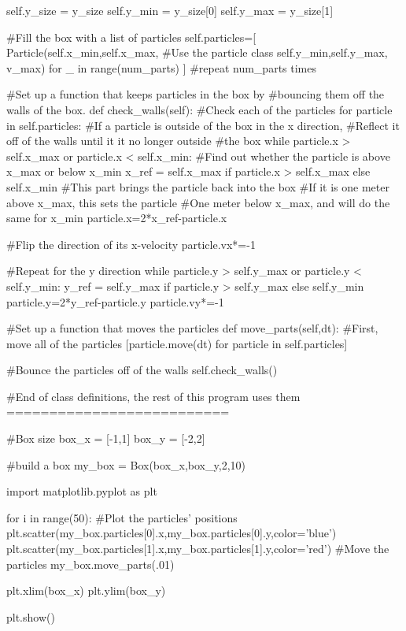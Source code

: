 \begin{codeexample}
\begin{VerbatimOut}{\listingFile}
        self.y_size = y_size
        self.y_min = y_size[0]
        self.y_max = y_size[1]

        #Fill the box with a list of particles
        self.particles=[
             Particle(self.x_min,self.x_max, #Use the particle class
                      self.y_min,self.y_max, v_max)
                      for _ in range(num_parts) ] #repeat num_parts times

    #Set up a function that keeps particles in the box by
    #bouncing them off the walls of the box.
    def check_walls(self):
        #Check each of the particles
        for particle in self.particles:
            #If a particle is outside of the box in the x direction,
            #Reflect it off of the walls until it it no longer outside
            #the box
            while particle.x > self.x_max or particle.x < self.x_min:
                #Find out whether the particle is above x_max or below x_min
                x_ref = self.x_max if particle.x > self.x_max else self.x_min
                #This part brings the particle back into the box
                #If it is one meter above x_max, this sets the particle
                #One meter below x_max, and will do the same for x_min
                particle.x=2*x_ref-particle.x

                #Flip the direction of its x-velocity
                particle.vx*=-1

            #Repeat for the y direction
            while particle.y > self.y_max or particle.y < self.y_min:
                y_ref = self.y_max if particle.y > self.y_max else self.y_min
                particle.y=2*y_ref-particle.y
                particle.vy*=-1

    #Set up a function that moves the particles
    def move_parts(self,dt):
        #First, move all of the particles
        [particle.move(dt) for particle in self.particles]

        #Bounce the particles off of the walls
        self.check_walls()

#End of class definitions, the rest of this program uses them ==========================


#Box size
box_x = [-1,1]
box_y = [-2,2]

#build a box
my_box = Box(box_x,box_y,2,10)

import matplotlib.pyplot as plt

for i in range(50):
    #Plot the particles' positions
    plt.scatter(my_box.particles[0].x,my_box.particles[0].y,color='blue')
    plt.scatter(my_box.particles[1].x,my_box.particles[1].y,color='red')
    #Move the particles
    my_box.move_parts(.01)

plt.xlim(box_x)
plt.ylim(box_y)

plt.show()
\end{VerbatimOut}
\end{codeexample}

